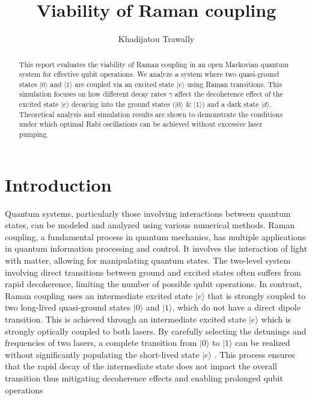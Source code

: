 \documentclass{article}
\title{Viability of Raman coupling}
\author{Khadijatou Trawally}
\begin{document}
\maketitle

\begin{abstract}
 This report evaluates the viability of Raman coupling in an open Markovian quantum system for effective qubit operations. We analyze a system where two quasi-ground states \(|0\rangle\) and \(|1\rangle\) are coupled via an excited state \(|e\rangle\) using Raman transitions. This simulation focuses on how different decay rates \(\gamma\) affect the decoherence effect of the excited state \(|e\rangle\) decaying into the ground states \((|0\rangle\) \& \(|1\rangle\)) and a dark state \(|d\rangle\).  Theoretical analysis and simulation results are shown to demonstrate the conditions under which optimal Rabi oscillations can be achieved without excessive laser pumping.

\end{abstract}
\section{Introduction}


Quantum systems, particularly those involving interactions between quantum states, can be modeled and analyzed using various numerical methods. Raman coupling, a fundamental process in quantum mechanics, has multiple applications in quantum information processing and control. It involves the interaction of light with matter, allowing for manipulating quantum states. The two-level system involving direct transitions between ground and excited states often suffers from rapid decoherence, limiting the number of possible qubit operations. In contrast, Raman coupling uses an intermediate excited state \(|e\rangle\) that is strongly coupled to two long-lived quasi-ground states \(|0\rangle\) and \(|1\rangle\), which do not have a direct dipole transition. This is achieved through an intermediate excited state  \(|e\rangle\) which is strongly optically coupled to both lasers.  By carefully selecting the detunings and frequencies of two lasers, a complete transition from \(|0\rangle\) to \(|1\rangle\) can be realized without significantly populating the short-lived state \(|e\rangle\) \cite{SteckQuantumAtomOptics}. This process ensures that the rapid decay of the intermediate state does not impact the overall transition thus mitigating decoherence effects and enabling prolonged qubit operations
\end{document}
